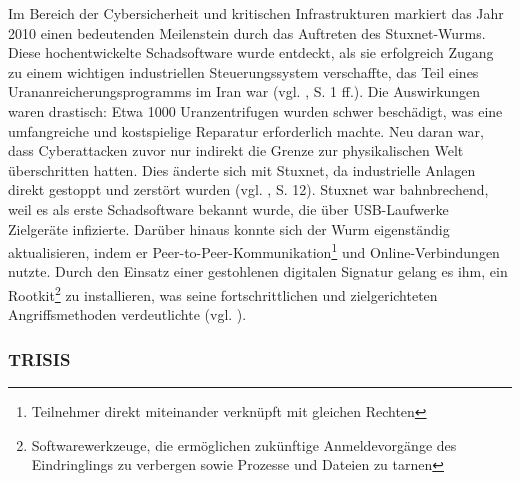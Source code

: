 Im Bereich der Cybersicherheit und kritischen Infrastrukturen markiert das Jahr 2010 einen bedeutenden Meilenstein durch das Auftreten des Stuxnet-Wurms. Diese hochentwickelte Schadsoftware wurde entdeckt, als sie erfolgreich Zugang zu einem wichtigen industriellen Steuerungssystem verschaffte, das Teil eines Urananreicherungsprogramms im Iran war (vgl. \cite{Stuxnet}, S. 1 ff.). Die Auswirkungen waren drastisch: Etwa 1000 Uranzentrifugen wurden schwer beschädigt, was eine umfangreiche und kostspielige Reparatur erforderlich machte. Neu daran war, dass Cyberattacken zuvor nur indirekt die Grenze zur physikalischen Welt überschritten hatten. Dies änderte sich mit Stuxnet, da industrielle Anlagen direkt gestoppt und zerstört wurden (vgl. \cite{Fraunhofer}, S. 12). Stuxnet war bahnbrechend, weil es als erste Schadsoftware bekannt wurde, die über USB-Laufwerke Zielgeräte infizierte. Darüber hinaus konnte sich der Wurm eigenständig aktualisieren, indem er Peer-to-Peer-Kommunikation\footnote{Teilnehmer direkt miteinander verknüpft mit gleichen Rechten} und Online-Verbindungen nutzte. Durch den Einsatz einer gestohlenen digitalen Signatur gelang es ihm, ein Rootkit\footnote{Softwarewerkzeuge, die ermöglichen zukünftige Anmeldevorgänge des Eindringlings zu verbergen sowie Prozesse und Dateien zu tarnen} zu installieren, was seine fortschrittlichen und zielgerichteten Angriffsmethoden verdeutlichte (vgl. \cite{NordVPN}).

\subsubsection{TRISIS}

